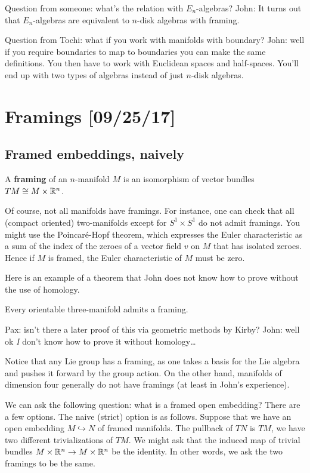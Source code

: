 \documentclass{amsart}
\begin{document}
Question from someone: what's the relation with $E_n$-algebras? John: It turns
out that $E_n$-algebras are equivalent to $n$-disk algebras with framing.

Question from Tochi: what if you work with manifolds with boundary? John: well
if you require boundaries to map to boundaries you can make the same definitions.
You then have to work with Euclidean spaces and half-spaces. You'll end up
with two types of algebras instead of just $n$-disk algebras.

\newpage
\section{Framings [09/25/17]}

\subsection{Framed embeddings, naively}

\begin{definition}
    A \textbf{framing} of an $n$-manifold $M$ is an isomorphism of vector bundles
    $TM \cong M\times \mathbb{R}^n$.
\end{definition}

Of course, not all manifolds have framings. For instance, one
can check that all (compact oriented) two-manifolds except for $S^1\times S^1$ do not admit framings.
You might use the Poincar\'e-Hopf theorem, which expresses the Euler characteristic
as a sum of the index of the zeroes of a vector field $v$ on $M$ that has isolated
zeroes. Hence if $M$ is framed, the Euler characteristic of $M$ must be zero.

Here is an example of a theorem that John does not know how to prove without the use of homology.
\begin{theorem}[Whitney or Wu]
    Every orientable three-manifold admits a framing.
\end{theorem}
Pax: isn't there a later proof of this via geometric methods by Kirby? John: well ok
\textit{I} don't know how to prove it without homology\ldots

Notice that any Lie group has a framing, as one takes a basis for the Lie algebra
and pushes it forward by the group action. On the other hand, manifolds of dimension
four generally do not have framings (at least in John's experience).

We can ask the following question: what is a framed open embedding? There are a few options.
The naive (strict) option is as follows. Suppose that we have an open embedding $M\hookrightarrow N$
of framed manifolds. The pullback of $TN$ is $TM$, we have two different trivializations
of $TM$. We might ask that the induced map of trivial bundles $M\times\mathbb{R}^n\to M\times\mathbb{R}^n$
be the identity. In other words, we ask the two framings to be the same.
\end{document}
